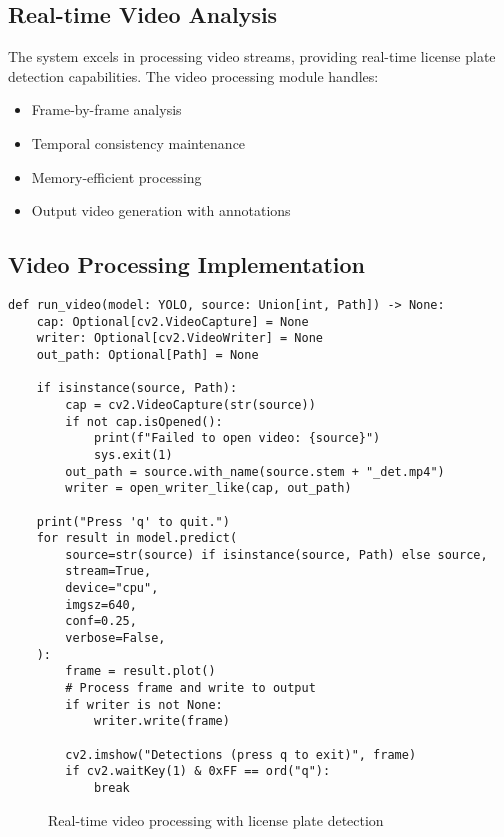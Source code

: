 \documentclass[12pt,a4paper]{article}
\begin{document}
\subsection{Real-time Video Analysis}

The system excels in processing video streams, providing real-time license plate detection capabilities. The video processing module handles:

\begin{itemize}
    \item Frame-by-frame analysis
    \item Temporal consistency maintenance
    \item Memory-efficient processing
    \item Output video generation with annotations
\end{itemize}

\subsection{Video Processing Implementation}

\begin{lstlisting}[caption=Video Processing Function]
def run_video(model: YOLO, source: Union[int, Path]) -> None:
    cap: Optional[cv2.VideoCapture] = None
    writer: Optional[cv2.VideoWriter] = None
    out_path: Optional[Path] = None

    if isinstance(source, Path):
        cap = cv2.VideoCapture(str(source))
        if not cap.isOpened():
            print(f"Failed to open video: {source}")
            sys.exit(1)
        out_path = source.with_name(source.stem + "_det.mp4")
        writer = open_writer_like(cap, out_path)

    print("Press 'q' to quit.")
    for result in model.predict(
        source=str(source) if isinstance(source, Path) else source,
        stream=True,
        device="cpu",
        imgsz=640,
        conf=0.25,
        verbose=False,
    ):
        frame = result.plot()
        # Process frame and write to output
        if writer is not None:
            writer.write(frame)
        
        cv2.imshow("Detections (press q to exit)", frame)
        if cv2.waitKey(1) & 0xFF == ord("q"):
            break
\end{lstlisting}

\begin{figure}[H]
\centering
\caption{Real-time video processing with license plate detection}
\end{figure}
\end{document}
